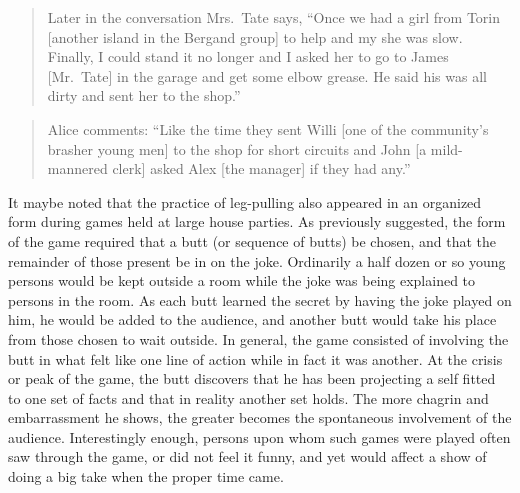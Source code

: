 \documentclass[twoside,symmetric,nobib,justified]{tufte-book}
\begin{document}
\begin{quote}
Later in the conversation Mrs.~Tate says, ``Once we had a girl from
Torin {[}another island in the Bergand group{]} to help and my she was
slow. Finally, I could stand it no longer and I asked her to go to James
{[}Mr.~Tate{]} in the garage and get some elbow grease. He said his was
all dirty and sent her to the shop.''
\end{quote}

\begin{quote}
Alice comments: ``Like the time they sent Willi {[}one of the
community's brasher young men{]} to the shop for short circuits and John
{[}a mild-mannered clerk{]} asked Alex {[}the manager{]} if they had
any.''
\end{quote}

It maybe noted that the practice of leg-pulling also appeared in an
organized form during games held at large house parties. As previously
suggested, the form of the game required that a butt (or sequence of
butts) be chosen, and that the remainder of those present be in on the
joke. Ordinarily a half dozen or so young persons would be kept outside
a room while the joke was being explained to persons in the room. As
each butt learned the secret by having the joke played on him, he would
be added to the audience, and another butt would take his place from
those chosen to wait outside. In general, the game consisted of
involving the butt in what felt like one line of action while in fact it
was another. At the crisis or peak of the game, the butt discovers that
he has been projecting a self fitted to one set of facts and that in
reality another set holds. The more chagrin and embarrassment he shows,
the greater becomes the spontaneous involvement of the audience.
Interestingly enough, persons upon whom such games were played often saw
through the game, or did not feel it funny, and yet would affect a show
of doing a big take when the proper time came.
\end{document}

